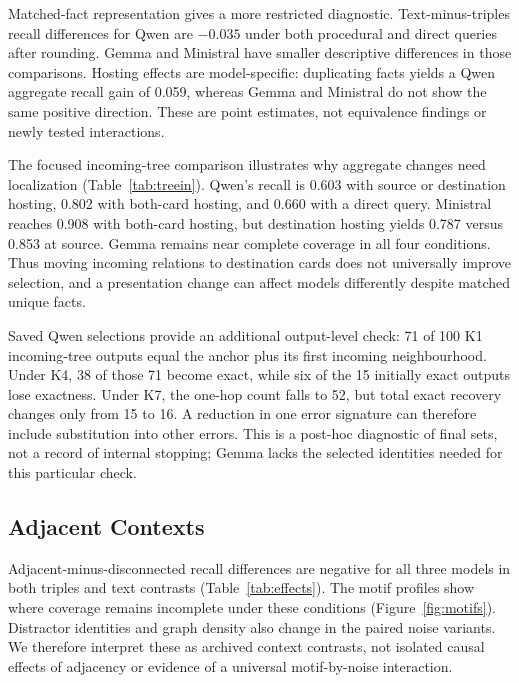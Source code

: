 Matched-fact representation gives a more restricted diagnostic. Text-minus-triples recall differences for Qwen are $-0.035$ under both procedural and direct queries after rounding. Gemma and Ministral have smaller descriptive differences in those comparisons. Hosting effects are model-specific: duplicating facts yields a Qwen aggregate recall gain of 0.059, whereas Gemma and Ministral do not show the same positive direction. These are point estimates, not equivalence findings or newly tested interactions.

\begin{table}[t]
\caption{Mean recall on six-node Tree-in tasks: one model per row, conditions in columns. K1/K3/K4 host triples on source/destination/both cards with a procedural query; K7 uses source cards and a direct query. Each cell retains 100 planned tasks. Ministral has 99 valid outcomes in K3 and 91 in K7; every other cell has 100. Invalid outcomes contribute zero.}
\label{tab:treein}
\centering\small

\end{table}
The focused incoming-tree comparison illustrates why aggregate changes need localization (Table~\ref{tab:treein}). Qwen's recall is 0.603 with source or destination hosting, 0.802 with both-card hosting, and 0.660 with a direct query. Ministral reaches 0.908 with both-card hosting, but destination hosting yields 0.787 versus 0.853 at source. Gemma remains near complete coverage in all four conditions. Thus moving incoming relations to destination cards does not universally improve selection, and a presentation change can affect models differently despite matched unique facts.

Saved Qwen selections provide an additional output-level check: 71 of 100 K1 incoming-tree outputs equal the anchor plus its first incoming neighbourhood. Under K4, 38 of those 71 become exact, while six of the 15 initially exact outputs lose exactness. Under K7, the one-hop count falls to 52, but total exact recovery changes only from 15 to 16. A reduction in one error signature can therefore include substitution into other errors. This is a post-hoc diagnostic of final sets, not a record of internal stopping; Gemma lacks the selected identities needed for this particular check.

\subsection{Adjacent Contexts}
Adjacent-minus-disconnected recall differences are negative for all three models in both triples and text contrasts (Table~\ref{tab:effects}). The motif profiles show where coverage remains incomplete under these conditions (Figure~\ref{fig:motifs}). Distractor identities and graph density also change in the paired noise variants. We therefore interpret these as archived context contrasts, not isolated causal effects of adjacency or evidence of a universal motif-by-noise interaction.
